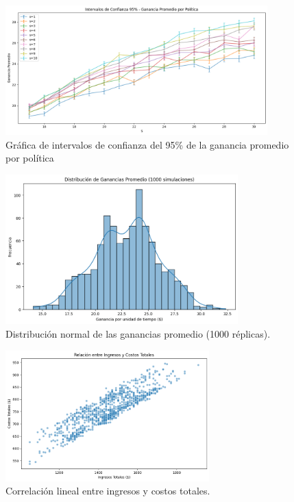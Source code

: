 \documentclass{report}
\begin{document}
\begin{figure}[h]
  \centering
  \includegraphics[width=0.9\textwidth]{intervalos_de_confianza_ganacia_promedio_politica.png}
  \caption{Gráfica de intervalos de confianza del 95\% de la ganancia promedio por política}
\end{figure}

\begin{figure}[h]
    \centering
    \includegraphics[width=0.8\textwidth]{distribucion_ganacias_promedio.png}
    \caption{Distribución normal de las ganancias promedio (1000 réplicas).}
\end{figure}

\begin{figure}[h]
    \centering
    \includegraphics[width=0.7\textwidth]{ingresos-costos_totales.png}
    \caption{Correlación lineal entre ingresos y costos totales.}
\end{figure}
\end{document}
